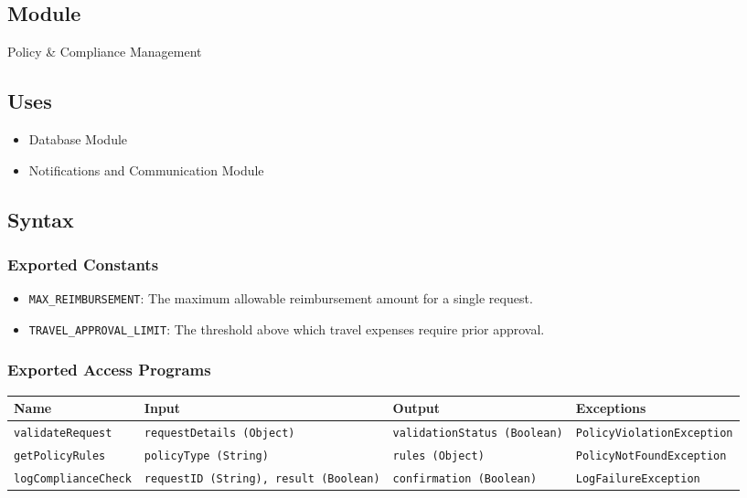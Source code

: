 \documentclass[12pt, titlepage]{article}
\begin{document}
\subsection{Module}
Policy \& Compliance Management

\subsection{Uses}
\begin{itemize}
    \item Database Module
    \item Notifications and Communication Module
\end{itemize}

\subsection{Syntax}

\subsubsection{Exported Constants}
\begin{itemize}
    \item \texttt{MAX\_REIMBURSEMENT}: The maximum allowable reimbursement amount for a single request.
    \item \texttt{TRAVEL\_APPROVAL\_LIMIT}: The threshold above which travel expenses require prior approval.
\end{itemize}

\subsubsection{Exported Access Programs}
\begin{center}
    \scriptsize
    \begin{tabular}{|p{3cm}|p{4cm}|p{4cm}|p{4cm}|}
        \hline
        \textbf{Name} & \textbf{Input} & \textbf{Output} & \textbf{Exceptions} \\
        \hline
        \texttt{validateRequest} & \texttt{requestDetails (Object)} & \texttt{validationStatus (Boolean)} & \texttt{PolicyViolationException} \\
        \hline
        \texttt{getPolicyRules} & \texttt{policyType (String)} & \texttt{rules (Object)} & \texttt{PolicyNotFoundException} \\
        \hline
        \texttt{logComplianceCheck} & \texttt{requestID (String), result (Boolean)} & \texttt{confirmation (Boolean)} & \texttt{LogFailureException} \\
        \hline
    \end{tabular}
\end{center}
\end{document}
